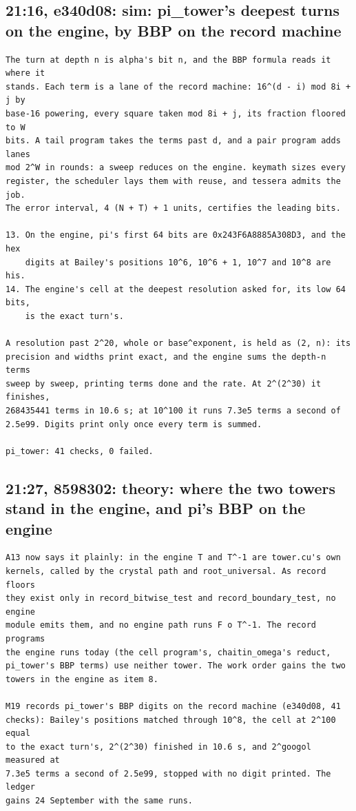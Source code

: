 \subsection{\texorpdfstring{21:16, e340d08: sim: pi\_\allowbreak{}tower's deepest turns on the engine, by BBP on the record machine}{21:16, e340d08: sim: pi\_tower's deepest turns on the engine, by BBP on the record machine}}

\begin{Verbatim}
The turn at depth n is alpha's bit n, and the BBP formula reads it where it
stands. Each term is a lane of the record machine: 16^(d - i) mod 8i + j by
base-16 powering, every square taken mod 8i + j, its fraction floored to W
bits. A tail program takes the terms past d, and a pair program adds lanes
mod 2^W in rounds: a sweep reduces on the engine. keymath sizes every
register, the scheduler lays them with reuse, and tessera admits the job.
The error interval, 4 (N + T) + 1 units, certifies the leading bits.

13. On the engine, pi's first 64 bits are 0x243F6A8885A308D3, and the hex
    digits at Bailey's positions 10^6, 10^6 + 1, 10^7 and 10^8 are his.
14. The engine's cell at the deepest resolution asked for, its low 64 bits,
    is the exact turn's.

A resolution past 2^20, whole or base^exponent, is held as (2, n): its
precision and widths print exact, and the engine sums the depth-n terms
sweep by sweep, printing terms done and the rate. At 2^(2^30) it finishes,
268435441 terms in 10.6 s; at 10^100 it runs 7.3e5 terms a second of
2.5e99. Digits print only once every term is summed.

pi_tower: 41 checks, 0 failed.
\end{Verbatim}

\subsection{\texorpdfstring{21:27, 8598302: theory: where the two towers stand in the engine, and pi's BBP on the engine}{21:27, 8598302: theory: where the two towers stand in the engine, and pi's BBP on the engine}}

\begin{Verbatim}
A13 now says it plainly: in the engine T and T^-1 are tower.cu's own
kernels, called by the crystal path and root_universal. As record floors
they exist only in record_bitwise_test and record_boundary_test, no engine
module emits them, and no engine path runs F o T^-1. The record programs
the engine runs today (the cell program's, chaitin_omega's reduct,
pi_tower's BBP terms) use neither tower. The work order gains the two
towers in the engine as item 8.

M19 records pi_tower's BBP digits on the record machine (e340d08, 41
checks): Bailey's positions matched through 10^8, the cell at 2^100 equal
to the exact turn's, 2^(2^30) finished in 10.6 s, and 2^googol measured at
7.3e5 terms a second of 2.5e99, stopped with no digit printed. The ledger
gains 24 September with the same runs.
\end{Verbatim}

